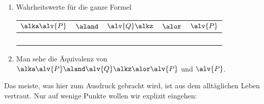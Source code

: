 \begin{tutorium}
\begin{itemize}
\begin{enumerate}
    \item Wahrheitswerte für die ganze Formel

      \begin{tabular}[t]{ccccc}
        \toprule
        $\alka\alv{P}$ & $\aland$ & $\alv{Q}\alkz$ & $\alor$ & $\alv{P}$\\
        \midrule
        \F &\F& \F &\F& \F \\
        \F &\F& \W &\F& \F\\
        \W &\F& \F &\W& \W\\
        \W &\W& \W &\W& \W\\
        \bottomrule
      \end{tabular}

    \item Man sehe die Äquivalenz von  $\alka\alv{P}\aland \alv{Q}\alkz\alor \alv{P}$ und $\alv{P}$.
    \end{enumerate}
  \end{itemize}
\end{tutorium}
%
Das meiste, was hier zum Ausdruck gebracht wird, ist aus dem
alltäglichen Leben vertraut. 
%
Nur auf wenige Punkte wollen wir explizit eingehen:
%
